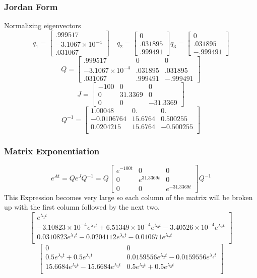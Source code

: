 \documentclass{beamer}
\begin{document}
\begin{frame}
\frametitle{Jordan Form}
Normalizing eigenvectors
$$
q_1=
\begin{bmatrix} .999517 \\ -3.1067\times10^{-4} \\ .031067 \end{bmatrix}
\quad
q_2=
\begin{bmatrix} 0 \\ .031895 \\ .999491 \end{bmatrix}
q_3=
\begin{bmatrix} 0 \\ .031895 \\ -.999491 \end{bmatrix}
$$
$$
Q
=
\begin{bmatrix}
.999517             & 0 & 0 \\
-3.1067\times10^{-4} & .031895 & .031895 \\
.031067            & .999491 & -.999491
\end{bmatrix}
$$
$$
J
=
\begin{bmatrix}
-100 & 0 & 0 \\
0 & 31.3369 & 0 \\
0 & 0 & -31.3369
\end{bmatrix}
$$
$$
Q^{-1}
=
\begin{bmatrix}
1.00048 & 0. & 0. \\
-0.0106764 & 15.6764 & 0.500255 \\
 0.0204215 & 15.6764 & -0.500255 \\
\end{bmatrix}
$$
\end{frame}

\begin{frame}
\frametitle{Matrix Exponentiation}
$$ e^{At} = Qe^JQ^{-1}
=
Q
\begin{bmatrix}
e^{-100t} & 0 & 0 \\
0 & e^{31.3369t} & 0 \\
0 & 0 & e^{-31.3369t}
\end{bmatrix}
Q^{-1}
$$
This Expression becomes very large so each column of the matrix will be broken up with the first column followed by the next two.
$$
\begin{bmatrix}
e^{\lambda_1 t} 																								\\
-3.10823\times 10^{-4} e^{\lambda_1 t}+6.51349\times 10^{-4} e^{\lambda_3 t}-3.40526\times 10^{-4} e^{\lambda_2 t} \\
 0.0310823 e^{\lambda_1 t}-0.0204112 e^{\lambda_3 t}-0.010671 e^{\lambda_2 t} 										\\
\end{bmatrix}
$$
$$
\begin{bmatrix}
0 								   			& 0 \\
0.5 e^{\lambda_3 t}+0.5 e^{\lambda_2 t} 			& 0.0159556 e^{\lambda_2 t}-0.0159556 e^{\lambda_3 t} \\
15.6684 e^{\lambda_2 t}-15.6684 e^{\lambda_3 t} 	& 0.5 e^{\lambda_3 t}+0.5 e^{\lambda_2 t} \\
\end{bmatrix}
$$
\end{frame}
\end{document}
